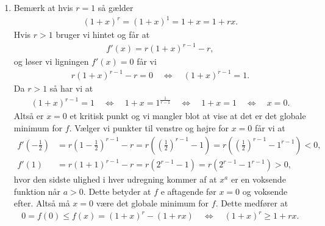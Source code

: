 \begin{enumerate}


	\item Bemærk at hvis $r=1$ så gælder 
	\begin{align*}
	(1+x)^r=(1+x)^1=1+x=1+rx.
	\end{align*}
	Hvis $r>1$ bruger vi hintet og får at
	\begin{align*}
	f'(x)=r(1+x)^{r-1}-r,
	\end{align*}
	og løser vi ligningen $f'(x)=0$ får vi
	\begin{align*}
	r(1+x)^{r-1}-r=0\quad\Leftrightarrow \quad (1+x)^{r-1}=1.
	\end{align*}
	Da $r>1$ så har vi at
	\begin{align*}
	(1+x)^{r-1}=1\quad\Leftrightarrow \quad 1+x=1^{\frac{1}{r-1}}\quad\Leftrightarrow \quad 1+x=1\quad\Leftrightarrow \quad x=0.
	\end{align*}
	Altså er $x=0$ et kritisk punkt og vi mangler blot at vise at det er det globale minimum for $f$. Vælger vi punkter til venstre og højre for $x=0$ får vi at
	\begin{align*}
	f'(-\frac{1}{2})&=r(1-\frac{1}{2})^{r-1}-r=r((\frac{1}{2})^{r-1}-1)=r((\frac{1}{2})^{r-1}-1^{r-1})<0,\\
	f'(1)&=r(1+1)^{r-1}-r=r(2^{r-1}-1)=r(2^{r-1}-1^{r-1})>0,
	\end{align*}
	hvor den sidste ulighed i hver udregning kommer af at $x^a$ er en voksende funktion når $a>0$. Dette betyder at $f$ e aftagende før $x=0$ og voksende efter. Altså må $x=0$ være det globale minimum for $f$. Dette medfører at
	\begin{align*}
	0=f(0)\leq f(x)= (1+x)^r-(1+rx)\quad \Leftrightarrow\quad (1+x)^r\geq 1+rx.
	\end{align*}
	

\end{enumerate}
